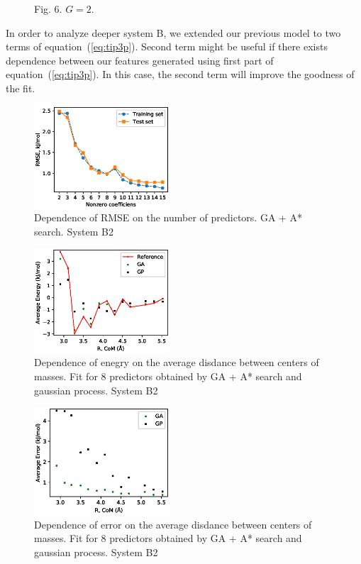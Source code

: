 \documentclass[aps,prl,reprint,amsmath,amssymb,nature]{revtex4-1}
\begin{document}
\begin{figure}[h]
\centering
\caption{Fig. 6. $G=2$.} \label{Fig:dipoledist}
\end{figure}

In order to analyze deeper system B, we extended our previous model to two terms of equation~(\ref{eq:tip3p}). Second term might be useful if there exists dependence between our features generated using first part of equation~(\ref{eq:tip3p}). In this case, the second term will improve the goodness of the fit.

\begin{figure}
\includegraphics[width=0.45\textwidth]{media/B2_GA_PATH_RMSE.eps}
\caption{Dependence of RMSE on the number of predictors. GA + A* search. System B2}\label{Fig:B2_RMSE}
\end{figure}

\begin{figure}
\includegraphics[width=0.45\textwidth]{media/B2_Energy_8_predictors.eps}
\caption{Dependence of enegry on the average disdance between centers of masses. Fit for 8 predictors obtained by GA + A* search and gaussian process. System B2}\label{Fig:B2_Energy}
\end{figure}

\begin{figure}
\includegraphics[width=0.45\textwidth]{media/B2_Error_8_predictors.eps}
\caption{Dependence of error on the average disdance between centers of masses. Fit for 8 predictors obtained by GA + A* search and gaussian process. System B2}\label{Fig:B2_RMSE_8_predictors}
\end{figure}
\end{document}
